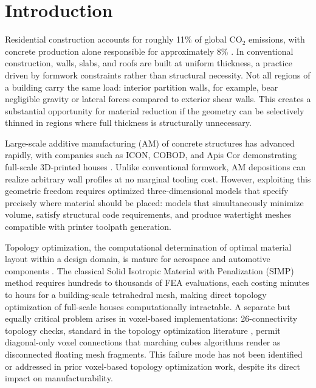 \documentclass[11pt]{article}
\theoremstyle{plain}
\theoremstyle{definition}
\theoremstyle{remark}
\begin{document}
\vspace{2.0em}


\section{Introduction}

Residential construction accounts for roughly 11\% of global CO$_2$ emissions, with concrete production alone responsible for approximately 8\% \cite{iea2021}. In conventional construction, walls, slabs, and roofs are built at uniform thickness, a practice driven by formwork constraints rather than structural necessity. Not all regions of a building carry the same load: interior partition walls, for example, bear negligible gravity or lateral forces compared to exterior shear walls. This creates a substantial opportunity for material reduction if the geometry can be selectively thinned in regions where full thickness is structurally unnecessary.

Large-scale additive manufacturing (AM) of concrete structures has advanced rapidly, with companies such as ICON, COBOD, and Apis Cor demonstrating full-scale 3D-printed houses \cite{buswell2018, ngo2018}. Unlike conventional formwork, AM depositions can realize arbitrary wall profiles at no marginal tooling cost. However, exploiting this geometric freedom requires optimized three-dimensional models that specify precisely where material should be placed: models that simultaneously minimize volume, satisfy structural code requirements, and produce watertight meshes compatible with printer toolpath generation.

Topology optimization, the computational determination of optimal material layout within a design domain, is mature for aerospace and automotive components \cite{bendsoe2003, sigmund2013}. The classical Solid Isotropic Material with Penalization (SIMP) method requires hundreds to thousands of FEA evaluations, each costing minutes to hours for a building-scale tetrahedral mesh, making direct topology optimization of full-scale houses computationally intractable. A separate but equally critical problem arises in voxel-based implementations: 26-connectivity topology checks, standard in the topology optimization literature \cite{xia2015}, permit diagonal-only voxel connections that marching cubes algorithms render as disconnected floating mesh fragments. This failure mode has not been identified or addressed in prior voxel-based topology optimization work, despite its direct impact on manufacturability.
\end{document}
